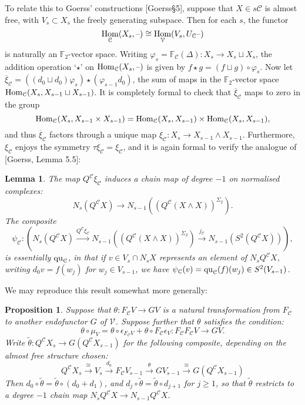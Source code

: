 \documentclass[11pt]{amsart}
\theoremstyle{plain}
\newtheorem{lem}[thm]{Lemma}
\newtheorem{prop}[thm]{Proposition}
\theoremstyle{definition}
\DeclareMathOperator{\Hom}{Hom}
\newcommand{\DASH}{\textup{--}}
\let\phi\varphi
\renewcommand{\to}{\longrightarrow}
\newcommand{\calC}{\mathcal{C}}
\newcommand{\calV}{\mathcal{V}}
\theoremstyle{plain}
\newcommand{\vect}[2]{\calV^{#1}_{#2}}
\newcommand{\quadratic}{\textup{qu}}
\newcommand{\F}{\mathbb{F}}
\begin{document}
\begin{Conventions and notation}
To relate this to Goerss' constructions [Goerss\S5], suppose that $X\in s\calC$ is almost free, with $V_s\subset X_s$ the freely generating subspace. Then for each $s$, the functor 
\[\Hom_\calC(X_s,\DASH)\cong \Hom_\calV(V_s,U_\calC\DASH)\]
is naturally an $\F_2$-vector space. Writing $\phi_s=\F_\calC(\Delta):X_s\to X_s\sqcup X_s$, the addition operation `$\star$' on $\Hom_\calC(X_s,\DASH)$ is given by $f\star g= (f\sqcup g)\circ\phi_s$. Now let
$\overline{\xi}_\calC=((d_0\sqcup d_0)\phi_s)\star(\phi_{s-1}d_0)$, the sum of maps in the $\F_2$-vector space $\textup{Hom}_\calC(X_s,X_{s-1}\sqcup X_{s-1})$. It is completely formal to check that $\overline{\xi}_\calC$ maps to zero in the group
\[\textup{Hom}_\calC(X_s,X_{s-1}\times X_{s-1})=\textup{Hom}_\calC(X_s,X_{s-1})\times \textup{Hom}_\calC(X_s,X_{s-1}),\]
and thus $\overline{\xi}_\calC$ factors through a unique map $\xi_\calC:X_s\to X_{s-1}\wedge X_{s-1}$. Furthermore, $\xi_\calC$ enjoys the symmetry $\tau\xi_\calC=\xi_\calC$, and it is again formal to verify the analogue of [Goerss, Lemma 5.5]:
\begin{lem}\label{psi is basically the quadratic part}
The map $Q^\calC\xi_\calC$ induces a chain map of degree $-1$ on normalised complexes:
\[N_s(Q^{\calC}X)\to N_{s-1}((Q^{\calC}(X\wedge X))^{\Sigma_2}).\]
The composite
\[\psi_\calC:\left(N_s(Q^{\calC}X)\overset{Q^\calC\xi_\calC}{\to} N_{s-1}((Q^{\calC}(X\wedge X))^{\Sigma_2})\overset{j_\calC}{\to} N_{s-1}(S^2(Q^{\calC}X))\right),\]
is essentially $\quadratic_\calC$, in that if $v\in V_s\cap N_sX$ represents an element of $N_sQ^\calC X$, writing $d_0v=f(w_j)$ for $w_j\in V_{s-1}$, we have $\psi_\calC(v)=\quadratic_\calC(f)(w_j)\in S^2(V_{s-1})$.
\end{lem}
We may reproduce this result somewhat more generally:
\begin{prop}\label{general CohOpns given irreducibility}
Suppose that $\theta:F_\calC V\to GV$ is a natural transformation from $F_\calC$ to another endofunctor $G$ of $\vect{}{}$. Suppose further that $\theta$ satisfies the condition:
\[\theta\circ\mu_V=\theta\circ \epsilon_{F_\calC V} +\theta\circ {F_\calC \epsilon_V}:F_\calC F_\calC V\to G V.\]
Write $\widetilde{\theta}:Q^{\calC}X_s\to G(Q^{\calC}X_{s-1})$ for the following composite, depending on the almost free structure chosen:
\[Q^{\calC}X_s\overset{\cong}{\to} V_s\overset{d_0}{\to}F_{\calC}V_{s-1}\overset{\theta}{\to}GV_{s-1}\overset{\cong}{\to}G(Q^{\calC}X_{s-1})\]
Then $d_0\circ\widetilde{\theta}=\widetilde{\theta}\circ(d_0+d_1)$, and $d_j\circ\widetilde{\theta}=\widetilde{\theta}\circ d_{j+1}$ for $j\geq1$, so that $\widetilde{\theta}$ restricts to a degree $-1$ chain map $N_sQ^\calC X\to N_{s-1}Q^\calC X$.

\end{prop}
\end{Conventions and notation}
\end{document}
